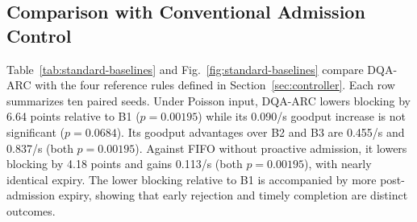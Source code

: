 \documentclass[journal]{IEEEtran}
\newcommand{\method}{DQA-ARC}
\begin{document}
\subsection{Comparison with Conventional Admission Control}

Table~\ref{tab:standard-baselines} and Fig.~\ref{fig:standard-baselines} compare \method{} with the four reference rules defined in Section~\ref{sec:controller}. Each row summarizes ten paired seeds. Under Poisson input, \method{} lowers blocking by 6.64 points relative to B1 ($p=0.00195$) while its 0.090/s goodput increase is not significant ($p=0.0684$). Its goodput advantages over B2 and B3 are 0.455/s and 0.837/s (both $p=0.00195$). Against FIFO without proactive admission, it lowers blocking by 4.18 points and gains 0.113/s (both $p=0.00195$), with nearly identical expiry. The lower blocking relative to B1 is accompanied by more post-admission expiry, showing that early rejection and timely completion are distinct outcomes.
\end{document}
